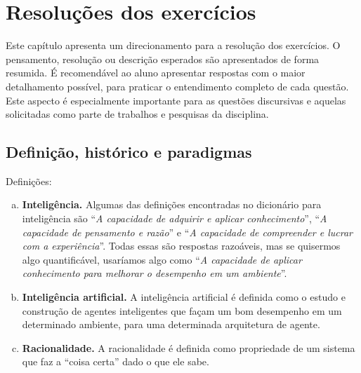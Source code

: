 \chapter{Resoluções dos exercícios}
\renewcommand\thechapter{}
\renewcommand\thesection{\arabic{section}}

Este capítulo apresenta um direcionamento para a resolução dos exercícios. O pensamento, resolução ou descrição esperados são apresentados de forma resumida. É recomendável ao aluno apresentar respostas com o maior detalhamento possível, para praticar o entendimento completo de cada questão. Este aspecto é especialmente importante para as questões discursivas e aquelas solicitadas como parte de trabalhos e pesquisas da disciplina.

\section{Definição, histórico e paradigmas}

\begin{solution}
Definições:
\begin{enumerate}[a.]
	\item \textbf{Inteligência.} Algumas das definições encontradas no dicionário para inteligência são ``\textit{A capacidade de adquirir e aplicar conhecimento}'', ``\textit{A capacidade de pensamento e razão}'' e ``\textit{A capacidade de compreender e lucrar com a experiência}''. Todas essas são respostas razoáveis, mas se quisermos algo quantificável, usaríamos algo como ``\textit{A capacidade de aplicar conhecimento para melhorar o desempenho em um ambiente}''.
	
	\item \textbf{Inteligência artificial.} A inteligência artificial é definida como o estudo e construção de agentes inteligentes que façam um bom desempenho em um determinado ambiente, para uma determinada arquitetura de agente.
	
	\item \textbf{Racionalidade.} A racionalidade é definida como propriedade de um sistema que faz a ``coisa certa'' dado o que ele sabe.
\end{enumerate}
\end{solution}

